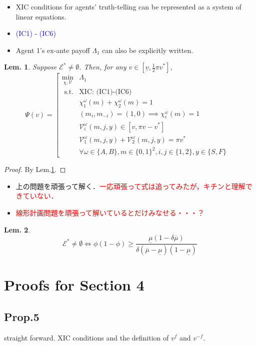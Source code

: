 \documentclass[11pt,a4paper,dvipdfmx]{article}
\newtheorem{lem}{Lem.}
\newcommand{\mE}{\mathcal{E}}
\newcommand{\mV}{\mathcal{V}}
\renewcommand{\bar}{\overline}
\newcommand{\equi}{\Longleftrightarrow}
\newcommand{\1}{\mathbbm{1}}
\newcommand{\kcomment}[1]{{\textcolor{blue}{#1}}}
\newcommand{\ocomment}[1]{{\textcolor{red}{#1}}}
\begin{document}
\begin{itemize}
	\item XIC conditions for agents' truth-telling can be represented as a system of linear equations.
	\item \kcomment{(IC1) - (IC6)}
	\item Agent 1's ex-ante payoff $\Lambda_1$ can also be explicitly written.
\end{itemize}

\begin{lem}\label{revelation}
Suppose $\mE^* \neq \emptyset$.	Then, for any $v \in [\underline{v}, \frac{1}{2}\pi v^*]$,
$$
\Psi(v) = 
\left[
\begin{array}{ccc}
	 \displaystyle{\min_{\chi, \mV}} & \Lambda_1  &  \\
	 \text{ s.t.}      & \text{XIC: (IC1)-(IC6)} \\
	 & \chi_1^\omega(m) + \chi_2^\omega(m) = 1 \\
	 & (m_i, m_{-i}) = (1,0) \implies \chi_i^\omega(m) = 1 \\
	 & \mV_i^\omega(m,j,y) \in [v, \pi v - v^*] \\
	 & \mV_1^\omega(m,j,y) + \mV_2^\omega(m,j,y) = \pi v^* \\
	 & \forall \omega \in \{A, B\}, m \in \{0,1\}^2, i,j \in \{1,2\}, y \in \{S, F\}
\end{array}
\right.
$$
\end{lem}
\begin{proof}
	By Lem.\ref{revelation}.
\end{proof}

\begin{itemize}
	\item 上の問題を頑張って解く．\ocomment{一応頑張って式は追ってみたが，キチンと理解できていない．}
	\item \ocomment{線形計画問題を頑張って解いているとだけみなせる・・・？}
\end{itemize}

\begin{lem}
	$$
	\mE^* \neq \emptyset \equi \phi(1 - \phi) \geq \frac{\underline{\mu}(1 - \delta \bar{\mu})}{\delta (\bar{\mu} - \underline{\mu})(1 - \underline{\mu})}
	$$
\end{lem}

\section*{Proofs for Section 4}
\subsection*{Prop.5}
straight forward. XIC conditions and the definition of $v^f$ and $v^{-f}$.
\end{document}
